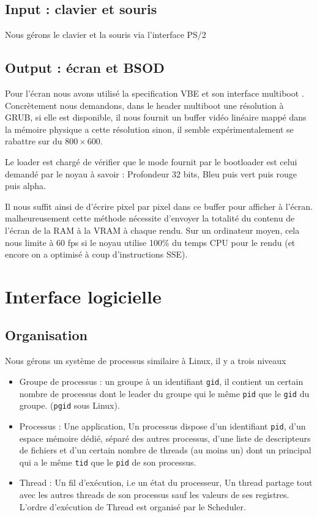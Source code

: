 \documentclass[12pt]{report}
\begin{document}
\section{Input : clavier et souris}

Nous gérons le clavier et la souris via l'interface PS/2

\section{Output : écran et BSOD}

Pour l'écran nous avons utilisé la specification VBE \cite{specVBE} et son
interface multiboot \cite{multiboot}.
Concrètement nous demandons, dans le header multiboot une résolution à GRUB, si
elle est disponible, il nous fournit un buffer vidéo linéaire mappé dans la
mémoire physique a cette résolution sinon, il semble expérimentalement se
rabattre sur du $800 \times 600$.

Le loader est chargé de vérifier que le mode fournit par le bootloader est celui
demandé par le noyau à savoir : Profondeur 32 bits, Bleu puis vert puis rouge
puis alpha.

Il nous suffit ainsi de d'écrire pixel par pixel dans ce buffer pour afficher à
l'écran. malheureusement cette méthode nécessite d'envoyer la totalité du
contenu de l'écran de la RAM à la VRAM à chaque rendu. Sur un ordinateur moyen,
cela nous limite à 60 fps si le noyau utilise 100\% du temps CPU pour le rendu
(et encore on a optimisé à coup d'instructions SSE).

\chapter{Interface logicielle}

\section{Organisation}

Nous gérons un système de processus similaire à Linux, il y a trois niveaux
\begin{itemize}
\item Groupe de processus : un groupe à un identifiant \verb$gid$, il contient
  un certain nombre de processus dont le leader du groupe qui le même \verb$pid$
  que le \verb$gid$ du groupe. (\verb$pgid$ sous Linux).
\item Processus : Une application, Un processus dispose d'un identifiant
  \verb$pid$, d'un espace mémoire dédié, séparé des autres processus, d'une
  liste de descripteurs de fichiers et d'un certain nombre de threads (au moins
  un) dont un principal qui a le même \verb$tid$ que le \verb$pid$ de son processus. 
\item Thread : Un \og fil \fg{} d'exécution, i.e un état du processeur, Un
  thread partage tout avec les autres threads de son processus sauf les valeurs
  de ses registres. L'ordre d'exécution de Thread est organisé par le Scheduler. 
\end{itemize}
\end{document}
